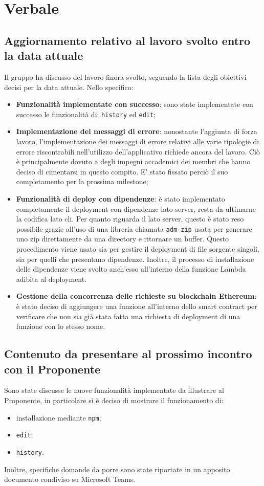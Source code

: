 \section{Verbale}

	\subsection{Aggiornamento relativo al lavoro svolto entro la data attuale}
	Il gruppo ha discusso del lavoro finora svolto, seguendo la lista degli obiettivi decisi per la data attuale. Nello specifico:
	\begin{itemize}
		\item \textbf{Funzionalità implementate con successo}: sono state implementate con successo le funzionalità di: \texttt{history} ed \texttt{edit}; 
		\item \textbf{Implementazione dei messaggi di errore}: nonostante l'aggiunta di forza lavoro, l'implementazione dei messaggi di errore relativi alle varie tipologie di errore riscontrabili nell'utilizzo dell'applicativo richiede ancora del lavoro. Ciò è principalmente dovuto a degli impegni accademici dei membri che hanno deciso di cimentarsi in questo compito. E' stato fissato perciò il suo completamento per la prossima milestone;
		\item \textbf{Funzionalità di deploy con dipendenze}: è stato implementato completamente il deployment con dipendenze lato server, resta da ultimarne la codifica lato cli. Per quanto riguarda il lato server, questo è stato reso possibile grazie all'uso di una libreria chiamata \texttt{adm-zip} usata per generare uno zip direttamente da una directory e ritornare un buffer. Questo procedimento viene usato sia per gestire il deployment di file sorgente singoli, sia per quelli che presentano dipendenze. Inoltre, il processo di installazione delle dipendenze viene svolto anch'esso all'interno della funzione Lambda adibita al deployment.
		\item \textbf{Gestione della concorrenza delle richieste su blockchain Ethereum}: è stato deciso di aggiungere una funzione all'interno dello smart contract per verificare che non sia già stata fatta una richiesta di deployment di una funzione con lo stesso nome.
	\end{itemize}
	\subsection{Contenuto da presentare al prossimo incontro con il Proponente}
		Sono state discusse le nuove funzionalità implementate da illustrare al Proponente, in particolare si è deciso di mostrare il funzionamento di:
		\begin{itemize}
			\item installazione mediante \texttt{npm};
			\item \texttt{edit};
			\item \texttt{history}.
		\end{itemize}
Inoltre, specifiche domande da porre sono state riportate in un apposito documento condiviso su Microsoft Teams.


